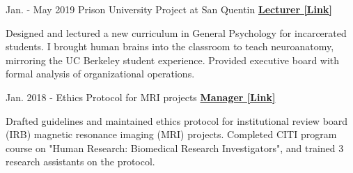 \begin{cventries}
  \cventry
    {Jan. - May 2019} %
    {Prison University Project at San Quentin}
    {\href{https://www.neh.gov/about/awards/national-humanities-medals/prison-university-project}{\textbf{Lecturer [Link]}}} %
    {} %
    {
      \begin{cvitems} %
        \item {Designed and lectured a new curriculum in General Psychology for incarcerated students. I brought human brains into the classroom to teach neuroanatomy, mirroring the UC Berkeley student experience. Provided executive board with formal analysis of organizational operations.}
      \end{cvitems}
    }
    
  \cventry 
    {Jan. 2018 - } %
    {Ethics Protocol for MRI projects}
    {\href{https://drive.google.com/file/d/1h66emU7-TRl-mSLZTEH01E3Qf5ZpEdbv/view?usp=sharing}{\textbf{Manager [Link]}}} %
    {} %
    {
      \begin{cvitems} %
      	\item {Drafted guidelines and maintained ethics protocol for institutional review board (IRB) magnetic resonance imaging (MRI) projects. Completed CITI program course on "Human Research: Biomedical Research Investigators", and trained 3 research assistants on the protocol.}
      \end{cvitems}
    }

\end{cventries}


